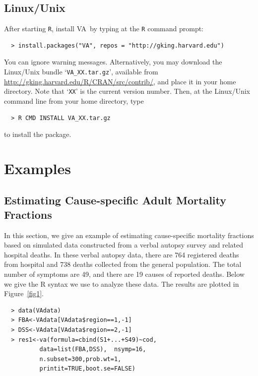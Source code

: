 \documentclass[oneside,letterpaper,titlepage]{article}
\newcommand{\VA}{\textsc{VA}}
\begin{document}
\subsection{Linux/Unix}

After starting \texttt{R}, install \VA\ by typing at the \texttt{R}
command prompt:
\begin{verbatim}
  > install.packages("VA", repos = "http://gking.harvard.edu")
\end{verbatim}

You can ignore warning messages.  Alternatively, you may download the
Linux/Unix bundle `\texttt{VA\_XX.tar.gz}', available from
\url{http://gking.harvard.edu/R/CRAN/src/contrib/}, and place it in
your home directory.  Note that `\texttt{XX}' is the current version
number.  Then, at the Linux/Unix command line from your home
directory, type
\begin{verbatim}
  > R CMD INSTALL VA_XX.tar.gz
\end{verbatim}
to install the package.

\section{Examples}

\subsection{Estimating Cause-specific Adult Mortality Fractions}
\label{sec:tanz}

In this section, we give an example of estimating cause-specific
mortality fractions based on simulated data constructed from a verbal
autopsy survey and related hospital deaths. In these verbal autopsy
data, there are 764 registered deaths from hospital and 738 deaths
collected from the general population. The total number of symptoms
are 49, and there are 19 causes of reported deaths. Below we give the
R syntax we use to analyze these data.  The results are plotted in
Figure~\ref{fig1}.

  \begin{verbatim}
  > data(VAdata)
  > FBA<-VAdata[VAdata$region==1,-1]
  > DSS<-VAdata[VAdata$region==2,-1]
  > res1<-va(formula=cbind(S1+...+S49)~cod,
          data=list(FBA,DSS),  nsymp=16,
          n.subset=300,prob.wt=1,
          printit=TRUE,boot.se=FALSE)
  \end{verbatim}
\end{document}
